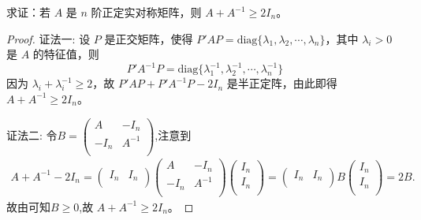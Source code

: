 \documentclass[../../main.tex]{subfiles}
\begin{document}
\begin{example}\label{proposition:例9.59}
求证：若 \(A\) 是 \(n\) 阶正定实对称矩阵，则 \(A + A^{-1} \geq 2I_n\)。
\end{example}
\begin{proof}
{\color{blue}证法一:}
设 \(P\) 是正交矩阵，使得 \(P'AP = \mathrm{diag}\{\lambda_1,\lambda_2,\cdots,\lambda_n\}\)，其中 \(\lambda_i > 0\) 是 \(A\) 的特征值，则
\[
P'A^{-1}P = \mathrm{diag}\{\lambda_1^{-1},\lambda_2^{-1},\cdots,\lambda_n^{-1}\}
\]
因为 \(\lambda_i + \lambda_i^{-1} \geq 2\)，故 \(P'AP + P'A^{-1}P - 2I_n\) 是半正定阵，由此即得 \(A + A^{-1} \geq 2I_n\)。

{\color{blue}证法二:}
令$B=\left( \begin{matrix}
A&		-I_n\\
-I_n&		A^{-1}\\
\end{matrix} \right) $,注意到
\begin{align*}
A+A^{-1}-2I_n=\left( \begin{matrix}
I_n&		I_n\\
\end{matrix} \right) \left( \begin{matrix}
A&		-I_n\\
-I_n&		A^{-1}\\
\end{matrix} \right) \left( \begin{array}{c}
I_n\\
I_n\\
\end{array} \right) =\left( \begin{matrix}
I_n&		I_n\\
\end{matrix} \right) B\left( \begin{array}{c}
I_n\\
I_n\\
\end{array} \right) =2B.
\end{align*}
故由可知$B\geq 0$,故 \(A + A^{-1} \geq 2I_n\)。 
\end{proof}
\end{document}
